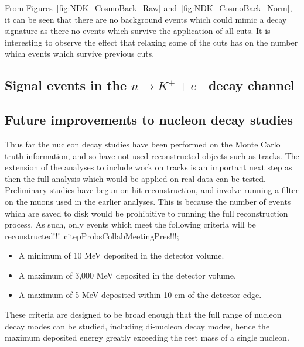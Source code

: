 From Figures~\ref{fig:NDK_CosmoBack_Raw} and~\ref{fig:NDK_CosmoBack_Norm}, it can be seen that there are no background events which could mimic a decay signature as there no events which survive the application of all cuts. It is interesting to observe the effect that relaxing some of the cuts has on the number which events which survive previous cuts. 

\subsection{Signal events in the $n \rightarrow K^{+} + e^{-}$ decay channel} \label{sec:NDKSig}

\subsection{Future improvements to nucleon decay studies} \label{sec:NDKImprov}
Thus far the nucleon decay studies have been performed on the Monte Carlo truth information, and so have not used reconstructed objects such as tracks. The extension of the analyses to include work on tracks is an important next step as then the full analysis which would be applied on real data can be tested. Preliminary studies have begun on hit reconstruction, and involve running a filter on the muons used in the earlier analyses. This is because the number of events which are saved to disk would be prohibitive to running the full reconstruction process. As such, only events which meet the following criteria will be reconstructed!!!~citep{ProbsCollabMeetingPres}!!!;
\begin{itemize}
\item A minimum of 10 MeV deposited in the detector volume.
\item A maximum of 3,000 MeV deposited in the detector volume.
\item A maximum of 5 MeV deposited within 10 cm of the detector edge.
\end{itemize}
These criteria are designed to be broad enough that the full range of nucleon decay modes can be studied, including di-nucleon decay modes, hence the maximum deposited energy greatly exceeding the rest mass of a single nucleon. \\

